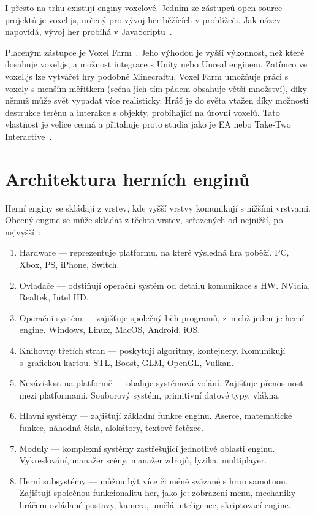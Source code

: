 \documentclass[thesis=M,czech]{FITthesis}[2019/12/23]
\begin{document}
I přesto na trhu existují enginy voxelové. Jedním ze zástupců open source projektů je voxel.js, určený pro vývoj her běžících v prohlížeči. Jak název napovídá, vývoj her probíhá v JavaScriptu~\cite{voxel_js}.

Placeným zástupce je Voxel Farm~\cite{voxel_farm}. Jeho výhodou je vyšší výkonnost, než které dosahuje voxel.js, a možnost integrace s Unity nebo Unreal enginem. Zatímco ve voxel.js lze vytvářet hry podobné Minecraftu, Voxel Farm umožňuje práci s voxely s menším měřítkem (scéna jich tím pádem obsahuje větší množství), díky němuž může svět vypadat více realisticky. Hráč je do světa vtažen díky možnosti destrukce terénu a interakce s objekty, probíhající na úrovni voxelů. Tato vlastnost je velice cenná a přitahuje proto studia jako je EA nebo Take-Two Interactive~\cite{voxel_engines}.

\section{Architektura herních enginů}

Herní enginy se skládají z vrstev, kde vyšší vrstvy komunikují s nižšími vrstvami. Obecný engine se může skládat z těchto vrstev, seřazených od nejnižší, po nejvyšší~\cite{gea_engine_arch}:

\begin{enumerate}

\item Hardware --- reprezentuje platformu, na které výsledná hra poběží. PC, Xbox, PS, iPhone, Switch.

\item Ovladače --- odstiňují operační systém od detailů komunikace s HW. \mbox{NVidia}, Realtek, Intel HD.

\item Operační systém --- zajišťuje společný běh programů, z~nichž jeden je herní engine. Windows, Linux, MacOS, Android, iOS.

\item Knihovny třetích stran --- poskytují algoritmy, kontejnery. Komunikují s~grafickou kartou. STL, Boost, GLM, OpenGL, Vulkan.

\item Nezávislost na platformě --- obaluje systémová volání. Zajišťuje přenos-nost mezi platformami. Souborový systém, primitivní datové typy, vlákna.

\item Hlavní systémy --- zajišťují základní funkce enginu. Aserce, matematické funkce, náhodná čísla, alokátory, textové řetězce.

\item Moduly --- komplexní systémy zastřešující jednotlivé oblasti enginu. Vykreslování, manažer scény, manažer zdrojů, fyzika, multiplayer.

\item Herní subsystémy --- můžou být více či méně svázané s hrou samotnou. Zajišťují společnou funkcionalitu her, jako je: zobrazení menu, mechaniky hráčem ovládané postavy, kamera, umělá inteligence, skriptovací engine.

\end{enumerate}
\end{document}
